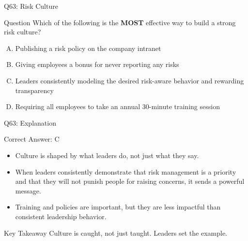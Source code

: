 \documentclass[aspectratio=169]{beamer}
\newcommand{\hq}[7]{%
	\begin{frame}{Q#1: #2}
		\begin{block}{Question}
			#3
		\end{block}
		\begin{enumerate}[(A)]
			#4
		\end{enumerate}
	\end{frame}
	\begin{frame}{Q#1: Explanation}
		\begin{block}{Correct Answer: #5}
			\begin{itemize}
				#6
			\end{itemize}
		\end{block}
		\begin{alertblock}{Key Takeaway}
			#7
		\end{alertblock}
	\end{frame}
}
\begin{document}
	\hq{63}{Risk Culture}
	{Which of the following is the \textbf{MOST} effective way to build a strong risk culture?}
	{\item Publishing a risk policy on the company intranet
		\item Giving employees a bonus for never reporting any risks
		\item Leaders consistently modeling the desired risk-aware behavior and rewarding transparency
		\item Requiring all employees to take an annual 30-minute training session}
	{C}
	{\item Culture is shaped by what leaders do, not just what they say.
		\item When leaders consistently demonstrate that risk management is a priority and that they will not punish people for raising concerns, it sends a powerful message.
		\item Training and policies are important, but they are less impactful than consistent leadership behavior.}
	{Culture is caught, not just taught. Leaders set the example.}
	
\end{document}
